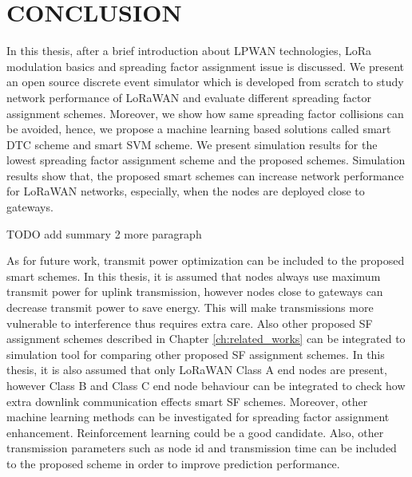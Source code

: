 \chapter{CONCLUSION}\label{ch:conclusion}

In this thesis, after a brief introduction about LPWAN technologies, LoRa modulation basics and spreading factor assignment issue is discussed. We present an open source discrete event simulator which is developed from scratch to study network performance of LoRaWAN and evaluate different spreading factor assignment schemes. Moreover, we show how same spreading factor collisions can be avoided, hence, we propose a machine learning based solutions called smart DTC scheme and smart SVM scheme. We present simulation results for the lowest spreading factor assignment scheme and the proposed schemes. Simulation results show that, the proposed smart schemes can increase network performance for LoRaWAN networks, especially, when the nodes are deployed close to gateways.

TODO add summary 2 more paragraph

As for future work, transmit power optimization can be included to the proposed smart schemes. In this thesis, it is assumed that nodes always use maximum transmit power for uplink transmission, however nodes close to gateways can decrease transmit power to save energy. This will make transmissions more vulnerable to interference thus requires extra care. Also other proposed SF assignment schemes described in Chapter \ref{ch:related_works} can be integrated to simulation tool for comparing other proposed SF assignment schemes. In this thesis, it is also assumed that only LoRaWAN Class A end nodes are present, however Class B and Class C end node behaviour can be integrated to check how extra downlink communication effects smart SF schemes. Moreover, other machine learning methods can be investigated for spreading factor assignment enhancement. Reinforcement learning could be a good candidate. Also, other transmission parameters such as node id and transmission time can be included to the proposed scheme in order to improve prediction performance.
